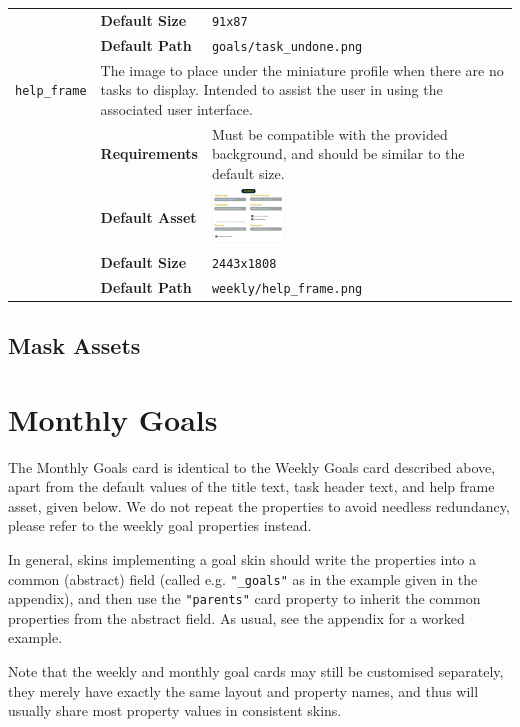 \documentclass[a4paper, 10pt]{report}
\begin{document}
\begin{longtable}{| p{} p{} p{}|}
  & \textbf{Default Size} & \texttt{91x87}\\
  & \textbf{Default Path} & \texttt{goals/task\_undone.png}\\
  \hypertarget{weeklygoals-help-frame}{\texttt{help\_frame}} & \multicolumn{2}{p{.70\textwidth+2\tabcolsep}|}{
    The image to place under the miniature profile when there are no tasks to display.
    Intended to assist the user in using the associated user interface.
  }\\
  & \textbf{Requirements} & Must be compatible with the provided background, and should be similar to the default size.\\
  & \textbf{Default Asset} & \centering\arraybackslash\includegraphics[width=0.25\textwidth, valign=m]{../base/assets/weekly/help_frame.png}\\
  & \textbf{Default Size} & \texttt{2443x1808}\\
  & \textbf{Default Path} & \texttt{weekly/help\_frame.png}\\
  \hline
\end{longtable}
\subsection{Mask Assets}
\section{Monthly Goals}
The Monthly Goals card is identical to the Weekly Goals card described above, apart from the default values of the title text, task header text, and help frame asset, given below. We do not repeat the properties to avoid needless redundancy, please refer to the weekly goal properties instead.

In general, skins implementing a goal skin should write the properties into a common (abstract) field (called e.g. \texttt{"\_goals"} as in the example given in the appendix), and then use the \texttt{"parents"} card property to inherit the common properties from the abstract field.
As usual, see the appendix for a worked example.

Note that the weekly and monthly goal cards may still be customised separately, they merely have exactly the same layout and property names,
and thus will usually share most property values in consistent skins.
\end{document}
